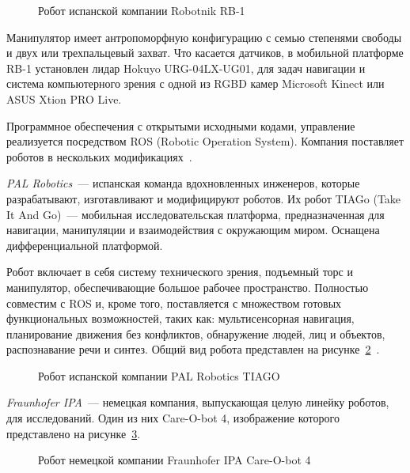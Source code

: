 \begin{figure}[h!]
	\caption{Робот испанской компании Robotnik RB-1}
	\label{img:rb1}
\end{figure}

Манипулятор имеет антропоморфную конфигурацию с семью степенями свободы и двух или трехпальцевый захват. Что касается датчиков, в мобильной платформе RB-1 установлен лидар Hokuyo URG-04LX-UG01, для задач навигации и система компьютерного зрения с одной из RGBD камер Microsoft Kinect или  ASUS Xtion PRO Live.

Программное обеспечения с открытыми исходными кодами, управление реализуется посредством ROS (Robotic Operation System). Компания поставляет роботов в нескольких модификациях~\cite{review}.


\textit{PAL Robotics}~--- испанская команда вдохновленных инженеров, которые разрабатывают, изготавливают и модифицируют роботов. Их робот TIAGo (Take It And Go)~--- мобильная исследовательская платформа, предназначенная для навигации, манипуляции и взаимодействия с окружающим миром. Оснащена дифференциальной платформой. 

Робот включает в себя систему технического зрения, подъемный торс и манипулятор, обеспечивающие большое рабочее пространство. Полностью совместим с ROS и, кроме того, поставляется с множеством готовых функциональных возможностей, таких как: мультисенсорная навигация, планирование движения без конфликтов, обнаружение людей, лиц и объектов, распознавание речи и синтез. Общий вид робота представлен на рисунке~\ref{img:tiago}~\cite{review}.

\begin{figure}[h!]
	\caption{Робот испанской компании PAL Robotics TIAGO}
	\label{img:tiago}
\end{figure}


\textit{Fraunhofer IPA}~--- немецкая компания, выпускающая целую линейку роботов, для исследований. Один из них Care-O-bot 4, изображение которого представлено на рисунке~\ref{img:careobot}.

\begin{figure}[h!]
	\caption{Робот немецкой компании Fraunhofer IPA Care-O-bot 4}
	\label{img:careobot}
\end{figure}

